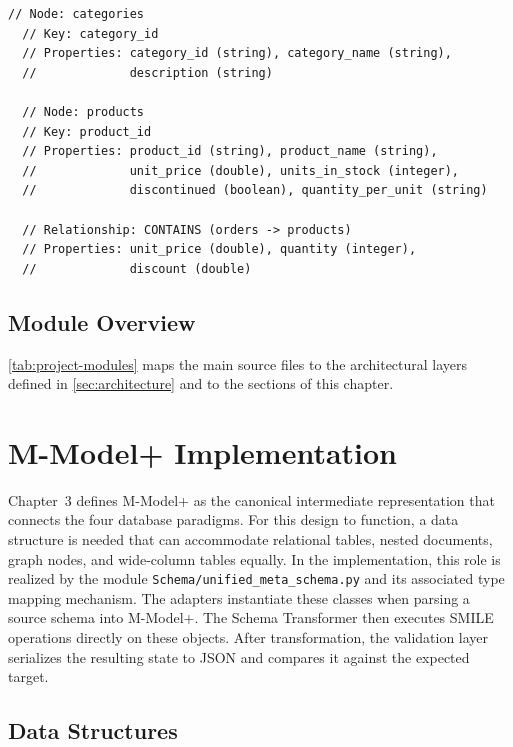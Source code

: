   \begin{lstlisting}[basicstyle=\small\ttfamily, caption={Neo4j schema definition via structured comment annotations}, label={lst:neo4j-schema-example}]
  // Node: categories
  // Key: category_id
  // Properties: category_id (string), category_name (string),
  //             description (string)

  // Node: products
  // Key: product_id
  // Properties: product_id (string), product_name (string),
  //             unit_price (double), units_in_stock (integer),
  //             discontinued (boolean), quantity_per_unit (string)

  // Relationship: CONTAINS (orders -> products)
  // Properties: unit_price (double), quantity (integer),
  //             discount (double)
  \end{lstlisting}

  \subsection{Module Overview}\label{subsec:tech-project-structure}

  \autoref{tab:project-modules} maps the main source files to the architectural layers defined in \autoref{sec:architecture} and to the sections of this chapter.



\section{M-Model+ Implementation}\label{sec:meta-impl}

Chapter~3 defines M-Model+ as the canonical intermediate representation that connects the four database paradigms. For this design to function, a data structure is needed that can accommodate relational tables, nested documents, graph nodes, and wide-column tables equally. In the implementation, this role is realized by the module \texttt{Schema/unified\_meta\_schema.py} and its associated type mapping mechanism. The adapters instantiate these classes when parsing a source schema into M-Model+. The Schema Transformer then executes SMILE  operations directly on these objects. After transformation, the validation layer serializes the resulting state to JSON and compares it against the expected target.

\subsection{Data Structures}\label{subsec:meta-data-structures}

